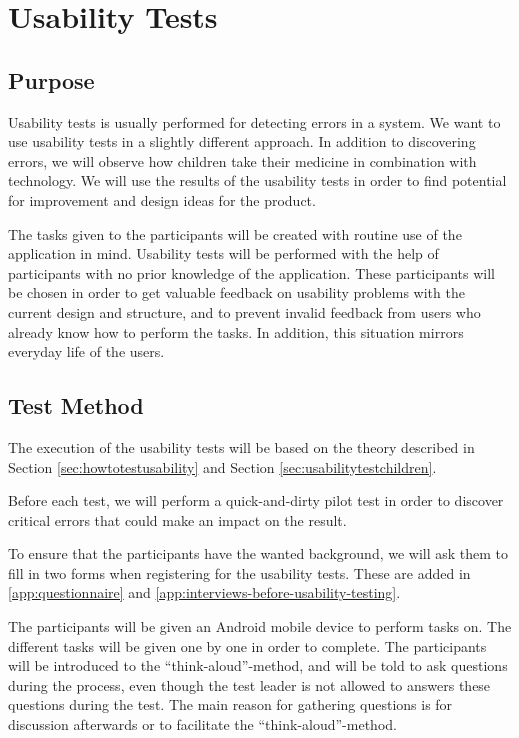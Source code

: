 \chapter{Usability Tests}
\label{chp:usabilitytests}


\section{Purpose}
\label{sec:usabilitypurpose}
Usability tests is usually performed for detecting errors in a system. We want to use usability tests in a slightly different approach. In addition to discovering errors, we will  observe how children take their medicine in combination with technology. We will use the results of the usability tests in order to find potential for improvement and design ideas for  the product.
 
The tasks given to the participants will be created with routine use of the application in mind. Usability tests will be performed with the help of participants with no prior knowledge of the application. These participants will be chosen in order to get valuable feedback on usability problems with the current design and structure, and to prevent invalid feedback from users who already know how to perform the tasks. In addition, this situation mirrors everyday life of the users.


\section{Test Method}
The execution of the usability tests will be based on the theory described in Section \ref{sec:howtotestusability} and Section \ref{sec:usabilitytestchildren}.

Before each test, we will perform a quick-and-dirty pilot test in order to discover critical errors that could make an impact on the result.

To ensure that the participants have the wanted background, we will ask them to fill in two forms when registering for the usability tests. These are added in \ref{app:questionnaire} and \ref{app:interviews-before-usability-testing}.

The participants will be given an Android mobile device to perform tasks on. The different tasks will be given one by one in order to complete. The participants will be introduced to the ``think-aloud''-method, and will be told to ask questions during the process, even though the test leader is not allowed to answers these questions during the test. The main reason for gathering questions is for discussion afterwards or to facilitate the ``think-aloud''-method. 

